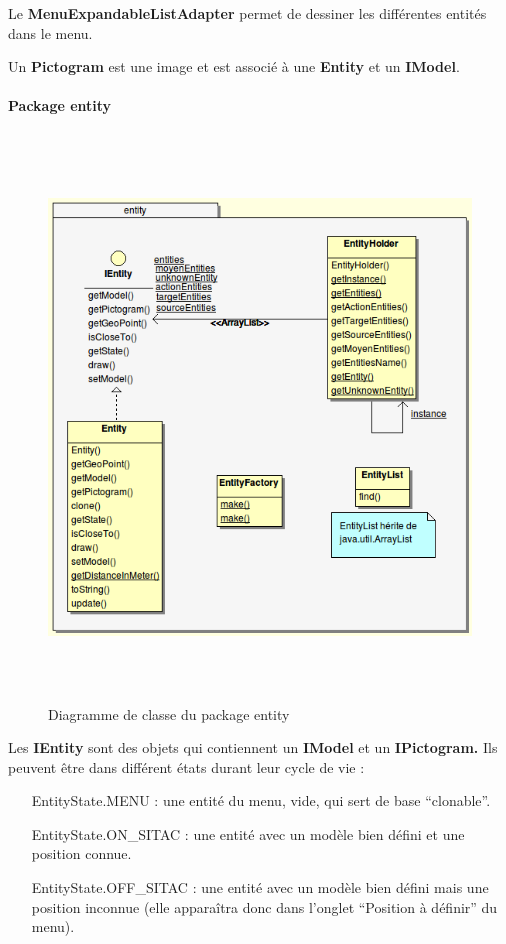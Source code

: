 \documentclass{article}
\begin{document}
Le \textbf{MenuExpandableListAdapter} permet de dessiner les différentes entités dans le menu.

Un \textbf{Pictogram} est une image et est associé à une \textbf{Entity} et un \textbf{IModel}.

\newpage
\paragraph{Package entity}
\begin{figure}[htbp]
\begin{center}
\includegraphics[width=410pt, height=424pt]{doc_dev-fig010.png}
\caption{Diagramme de classe du package entity}
\end{center}
\end{figure}

Les \textbf{IEntity} sont des objets qui contiennent un \textbf{IModel } et un \textbf{IPictogram.} Ils peuvent être dans différent états durant leur cycle de vie :

\begin{itemize}

\item[EntityState.MENU : ] une entité du menu, vide, qui sert de base ``clonable''.

\item[EntityState.ON\_SITAC : ] une entité avec un modèle bien défini et une position connue.

\item[EntityState.OFF\_SITAC : ] une entité avec un modèle bien défini mais une position inconnue (elle apparaîtra donc dans l'onglet ``Position à définir'' du menu).

\end{itemize}
\end{document}
